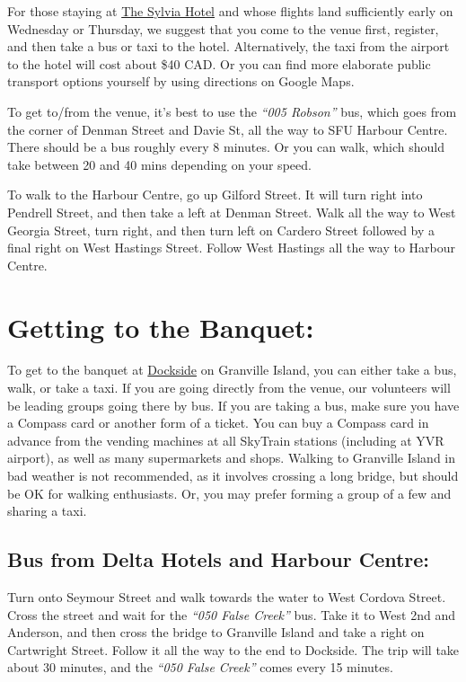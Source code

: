 \documentclass[letterpaper,12pt]{article}
\newcommand{\bus}[1]{\textit{``#1''}}
\begin{document}
For those staying at \href{https://sylviahotel.com/}{The Sylvia Hotel} and whose flights land sufficiently early on Wednesday or Thursday, we suggest that you come to the venue first, register, and then take a bus or taxi to the hotel. Alternatively, the taxi from the airport to the hotel will cost about \$40 CAD.  Or you can find more elaborate public transport options yourself by using directions on Google Maps.

To get to/from the venue, it's best to use the \bus{005 Robson} bus, which goes from the corner of Denman Street and Davie St, all the way to SFU Harbour Centre. There should be a bus roughly every 8 minutes. Or you can walk, which should take between 20 and 40 mins depending on your speed.

To walk to the Harbour Centre, go up Gilford Street. It will turn right into Pendrell Street, and then take a left at Denman Street. Walk all the way to West Georgia Street, turn right, and then turn left on Cardero Street followed by a final right on West Hastings Street. Follow West Hastings all the way to Harbour Centre.

\section*{Getting to the Banquet:}

To get to the banquet at \href{http://docksidevancouver.com}{Dockside} on Granville Island, you can either take a bus, walk, or take a taxi. If you are going directly from the venue, our volunteers will be leading groups going there by bus. If you are taking a bus, make sure you have a Compass card or another form of a ticket. You can buy a Compass card in advance from the vending machines at all SkyTrain stations (including at YVR airport), as well as many supermarkets and shops. Walking to Granville Island in bad weather is not recommended, as it involves crossing a long bridge, but should be OK for walking enthusiasts. Or, you may prefer forming a group of a few and sharing a taxi.

\subsection*{Bus from Delta Hotels and Harbour Centre:}

Turn onto Seymour Street and walk towards the water to West Cordova Street. Cross the street and wait for the \bus{050 False Creek} bus. Take it to West 2nd and Anderson, and then cross the bridge to Granville Island and take a right on Cartwright Street. Follow it all the way to the end to Dockside. The trip will take about 30 minutes, and the \bus{050 False Creek} comes every 15 minutes.
\end{document}
